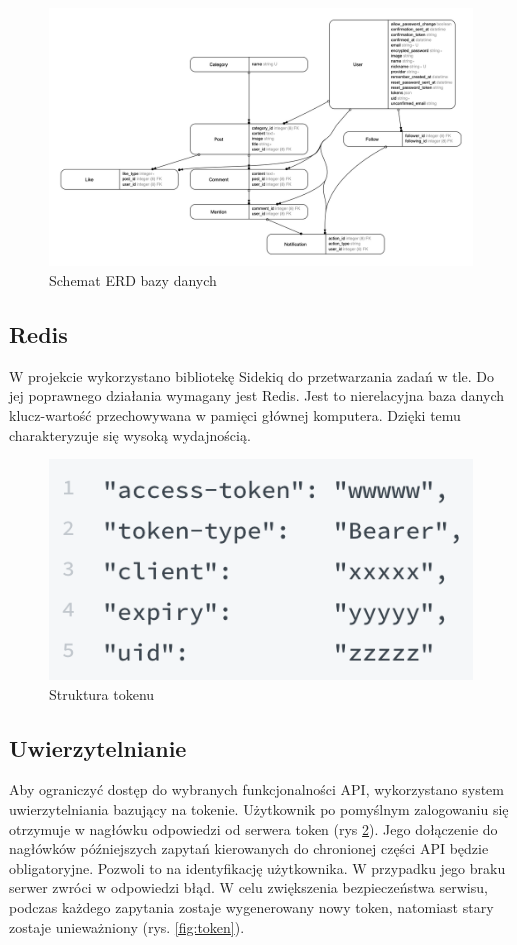 \documentclass[declaration,shortabstract,polish,inz]{iithesis}
\begin{document}
\begin{figure}[H]
    \centering
    \includegraphics[width=\textwidth]{images/erd.png}
    \caption{Schemat ERD bazy danych}
    \label{fig:erd_diagram}
\end{figure}

\subsection{Redis}
W projekcie wykorzystano bibliotekę Sidekiq \cite{sidekiq} do przetwarzania zadań w tle. Do jej poprawnego działania wymagany jest Redis. Jest to nierelacyjna baza danych klucz-wartość przechowywana w pamięci głównej komputera. Dzięki temu charakteryzuje się wysoką wydajnością.

\begin{figure}[H]
    \centering
    \includegraphics{images/token.png}
    \caption{Struktura tokenu}
    \label{fig:token2}
\end{figure}
\subsection{Uwierzytelnianie}
Aby ograniczyć dostęp do wybranych funkcjonalności API, wykorzystano system uwierzytelniania bazujący na tokenie. Użytkownik po pomyślnym zalogowaniu się otrzymuje w nagłówku odpowiedzi od serwera token (rys \ref{fig:token2}). Jego dołączenie do nagłówków późniejszych zapytań kierowanych do chronionej części API będzie obligatoryjne. Pozwoli to na identyfikację użytkownika. W przypadku jego braku serwer zwróci w odpowiedzi błąd. W celu zwiększenia bezpieczeństwa serwisu, podczas każdego zapytania zostaje wygenerowany nowy token, natomiast stary zostaje unieważniony (rys. \ref{fig:token}).
\end{document}
